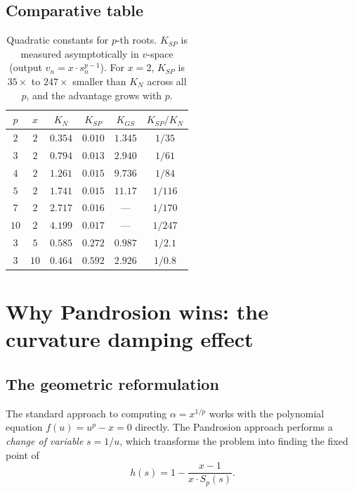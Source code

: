 \documentclass[11pt,a4paper]{article}
\theoremstyle{definition}
\begin{document}
\subsection{Comparative table}

\begin{table}[H]
\centering
\renewcommand{\arraystretch}{1.25}
\begin{tabular}{cccccc}
\toprule
$p$ & $x$ & $K_N$ & $K_{SP}$ & $K_{GS}$ & $K_{SP}/K_N$ \\
\midrule
$2$ & $2$ & $0.354$ & $0.010$ & $1.345$ & $1/35$ \\
$3$ & $2$ & $0.794$ & $0.013$ & $2.940$ & $1/61$ \\
$4$ & $2$ & $1.261$ & $0.015$ & $9.736$ & $1/84$ \\
$5$ & $2$ & $1.741$ & $0.015$ & $11.17$ & $1/116$ \\
$7$ & $2$ & $2.717$ & $0.016$ & --- & $1/170$ \\
$10$ & $2$ & $4.199$ & $0.017$ & --- & $1/247$ \\
\midrule
$3$ & $5$ & $0.585$ & $0.272$ & $0.987$ & $1/2.1$ \\
$3$ & $10$ & $0.464$ & $0.592$ & $2.926$ & $1/0.8$ \\
\bottomrule
\end{tabular}
\caption{Quadratic constants for $p$-th roots.  $K_{SP}$ is measured asymptotically in $v$-space (output $v_n = x \cdot s_n^{p-1}$).  For $x=2$, $K_{SP}$ is $35\times$ to $247\times$ smaller than $K_N$ across all $p$, and the advantage grows with $p$.}
\label{tab:constants}
\end{table}

\section{Why Pandrosion wins: the curvature damping effect}
\label{sec:why}

\subsection{The geometric reformulation}

The standard approach to computing $\alpha = x^{1/p}$ works with the polynomial equation $f(u) = u^p - x = 0$ directly.  The Pandrosion approach performs a \emph{change of variable} $s = 1/u$, which transforms the problem into finding the fixed point of
\[
  h(s) = 1 - \frac{x-1}{x \cdot S_p(s)}.
\]
\end{document}
